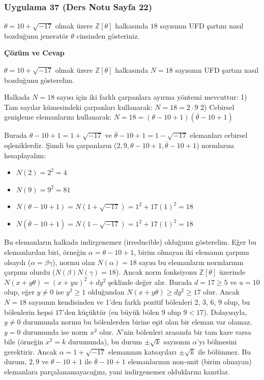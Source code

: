\documentclass[11pt, a4paper]{article}
\newenvironment{cozum}{
    \vspace{0.5cm}
    \noindent\textcolor{green!60!black}{\faCheckCircle\enspace \textbf{\Large Çözüm ve Cevap}}\par\vspace{0.2cm}
}{}
\begin{document}
\subsubsection{Uygulama 37 (Ders Notu Sayfa 22)}
\begin{sorubox}
$\theta = 10 + \sqrt{-17}$ olmak üzere $\mathbb{Z}[\theta]$ halkasında $18$ sayısının UFD şartını nasıl bozduğunu jeneratör $\theta$ cinsinden gösteriniz.
\end{sorubox}
\begin{cozum}
$\theta = 10 + \sqrt{-17}$ olmak üzere $\mathbb{Z}[\theta]$ halkasında $N = 18$ sayısının UFD şartını nasıl bozduğunu gösterelim.

Halkada $N = 18$ sayısı için iki farklı çarpanlara ayırma yöntemi mevcuttur:
1) Tam sayılar kümesindeki çarpanları kullanarak: $N = 18 = 2 \cdot 9$
2) Cebirsel genişleme elemanlarını kullanarak: $N = 18 = (\theta - 10 + 1)(\bar{\theta} - 10 + 1)$

Burada $\theta - 10 + 1 = 1 + \sqrt{-17}$ ve $\bar{\theta} - 10 + 1 = 1 - \sqrt{-17}$ elemanları cebirsel eşleniklerdir. Şimdi bu çarpanların ($2, 9, \theta - 10 + 1, \bar{\theta} - 10 + 1$) normlarını hesaplayalım:
\begin{itemize}
    \item $N(2) = 2^2 = 4$
    \item $N(9) = 9^2 = 81$
    \item $N(\theta - 10 + 1) = N(1 + \sqrt{-17}) = 1^2 + 17(1)^2 = 18$
    \item $N(\bar{\theta} - 10 + 1) = N(1 - \sqrt{-17}) = 1^2 + 17(1)^2 = 18$
\end{itemize}

Bu elemanların halkada indirgenemez (irreducible) olduğunu gösterelim. Eğer bu elemanlardan biri, örneğin $\alpha = \theta - 10 + 1$, birim olmayan iki elemanın çarpımı olsaydı ($\alpha = \beta \gamma$), normu olan $N(\alpha) = 18$ sayısı bu elemanların normlarının çarpımı olurdu ($N(\beta)N(\gamma) = 18$). Ancak norm fonksiyonu $\mathbb{Z}[\theta]$ üzerinde $N(x+y\theta) = (x+yu)^2 + dy^2$ şeklinde değer alır. Burada $d = 17 \ge 5$ ve $u = 10$ olup, eğer $y \neq 0$ ise $y^2 \ge 1$ olduğundan $N(x+y\theta) \ge dy^2 \ge 17$ olur. Ancak $N = 18$ sayısının kendisinden ve 1'den farklı pozitif bölenleri 2, 3, 6, 9 olup, bu bölenlerin hepsi $17$'den küçüktür (en büyük bölen 9 olup $9 < 17$). Dolayısıyla, $y \neq 0$ durumunda normu bu bölenlerden birine eşit olan bir eleman var olamaz. $y = 0$ durumunda ise norm $x^2$ olur. $N$'nin bölenleri arasında bir tam kare varsa bile (örneğin $x^2 = k$ durumunda), bu durum $\pm \sqrt{k}$ sayısının $\alpha$'yı bölmesini gerektirir. Ancak $\alpha = 1+\sqrt{-17}$ elemanının katsayıları $\pm \sqrt{k}$ ile bölünmez. Bu durum, $2, 9$ ve $\theta - 10 + 1$ ile $\bar{\theta} - 10 + 1$ elemanlarının non-unit (birim olmayan) elemanlara parçalanamayacağını, yani indirgenemez olduklarını kanıtlar.


\end{cozum}
\end{document}
